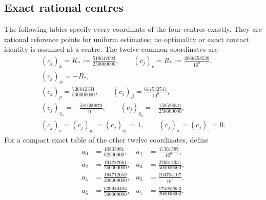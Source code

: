 \documentclass[11pt,reqno]{amsart}
\theoremstyle{definition}
\theoremstyle{remark}
\begin{document}
\subsection{Exact rational centres}
\label{transport:centres-detail}
The following tables specify every coordinate of the four centres
exactly.  They are rational reference points for uniform estimates;
no optimality or exact contact identity is assumed at a centre.
The twelve common coordinates are
\begin{equation}\label{transport:common-centres}
\begin{gathered}
(c_j)_k=K_*:=\frac{518617093}{250000000},\qquad
(c_j)_r=R_*:=\frac{2066258539}{10^9},\\
(c_j)_w=-R_*,\\
(c_j)_p=\frac{726612331}{500000000},\qquad
(c_j)_\beta=\frac{617532517}{10^9},\\
(c_j)_{v_0}=-\frac{581690673}{10^9},\qquad
(c_j)_{q_0}=-\frac{159528331}{250000000},\\
(c_j)_e=(c_j)_{u_0}=(c_j)_{x_0}=1,\qquad
(c_j)_\sigma=(c_j)_\tau=0.
\end{gathered}
\end{equation}
For a compact exact table of the other twelve coordinates, define
\begin{equation}\label{transport:centre-table-constants}
\begin{aligned}
a_0&=\frac{10833981}{62500000},&
a_1&=\frac{47361589}{10^9},\\
a_2&=\frac{194787661}{250000000},&
a_3&=\frac{226612331}{500000000},\\
a_4&=\frac{194712659}{200000000},&
a_5&=\frac{194705107}{10^9},\\
a_6&=\frac{639940483}{500000000},&
a_7&=\frac{175952653}{200000000}.
\end{aligned}
\end{equation}
\end{document}
